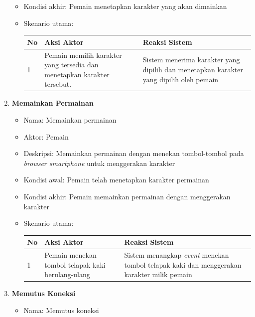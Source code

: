 \begin{enumerate}
\begin{itemize}
		\item Kondisi akhir: Pemain menetapkan karakter yang akan dimainkan
		
		\item Skenario utama:
		
\begin{tabular}{ |p{1cm}|p{4cm}|p{4cm}|}
	\hline
	No & Aksi Aktor & Reaksi Sistem \\ \hline
	1 & Pemain memilih karakter yang tersedia dan menetapkan karakter tersebut. & Sistem menerima karakter yang dipilih dan menetapkan karakter yang dipilih oleh pemain \\ \hline
\end{tabular}
		
	\end{itemize}
	
	\item \textbf{Memainkan Permainan}
		
		\begin{itemize}
			\item Nama: Memainkan permainan
			
			\item Aktor: Pemain
			
			\item Deskripsi: Memainkan permainan dengan menekan tombol-tombol pada \textit{browser smartphone} untuk menggerakan karakter
			
			\item Kondisi awal: Pemain telah menetapkan karakter permainan
			
			\item Kondisi akhir: Pemain memainkan permainan dengan menggerakan karakter
			
			\item Skenario utama:

\begin{tabular}{ |p{1cm}|p{4cm}|p{4cm}|}
	\hline
	No & Aksi Aktor & Reaksi Sistem \\ \hline
	1 & Pemain menekan tombol telapak kaki berulang-ulang & Sistem menangkap \textit{event} menekan tombol telapak kaki dan menggerakan karakter milik pemain \\ \hline
\end{tabular}	
			
		\end{itemize}
	
	\item \textbf{Memutus Koneksi}
	
		\begin{itemize}
			\item Nama: Memutus koneksi
			

\end{itemize}
\end{enumerate}
